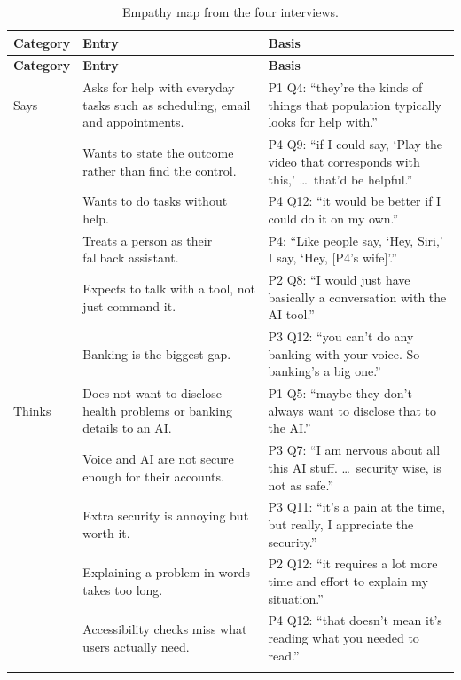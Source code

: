 \documentclass[12pt, titlepage]{article}
\begin{document}
{\small
\setlength{\tabcolsep}{4pt}
\begin{longtable}{>{\raggedright\arraybackslash}p{1.8cm} >{\raggedright\arraybackslash}p{5.7cm} >{\raggedright\arraybackslash}p{7.6cm}}
\caption{Empathy map from the four interviews.}\label{tab:empathy}\\
\toprule
\textbf{Category} & \textbf{Entry} & \textbf{Basis}\\
\midrule
\endfirsthead
\toprule
\textbf{Category} & \textbf{Entry} & \textbf{Basis}\\
\midrule
\endhead
\bottomrule
\endfoot
Says & Asks for help with everyday tasks such as scheduling, email and appointments. & P1 Q4: ``they're the kinds of things that population typically looks for help with.''\\\addlinespace[3pt]
 & Wants to state the outcome rather than find the control. & P4 Q9: ``if I could say, `Play the video that corresponds with this,' \ldots\ that'd be helpful.''\\\addlinespace[3pt]
 & Wants to do tasks without help. & P4 Q12: ``it would be better if I could do it on my own.''\\\addlinespace[3pt]
 & Treats a person as their fallback assistant. & P4: ``Like people say, `Hey, Siri,' I say, `Hey, [P4's wife]'.''\\\addlinespace[3pt]
 & Expects to talk with a tool, not just command it. & P2 Q8: ``I would just have basically a conversation with the AI tool.''\\\addlinespace[3pt]
 & Banking is the biggest gap. & P3 Q12: ``you can't do any banking with your voice. So banking's a big one.''\\
\midrule
Thinks & Does not want to disclose health problems or banking details to an AI. & P1 Q5: ``maybe they don't always want to disclose that to the AI.''\\\addlinespace[3pt]
 & Voice and AI are not secure enough for their accounts. & P3 Q7: ``I am nervous about all this AI stuff. \ldots\ security wise, is not as safe.''\\\addlinespace[3pt]
 & Extra security is annoying but worth it. & P3 Q11: ``it's a pain at the time, but really, I appreciate the security.''\\\addlinespace[3pt]
 & Explaining a problem in words takes too long. & P2 Q12: ``it requires a lot more time and effort to explain my situation.''\\\addlinespace[3pt]
 & Accessibility checks miss what users actually need. & P4 Q12: ``that doesn't mean it's reading what you needed to read.''\\\addlinespace[3pt]

\end{longtable}}
\end{document}
